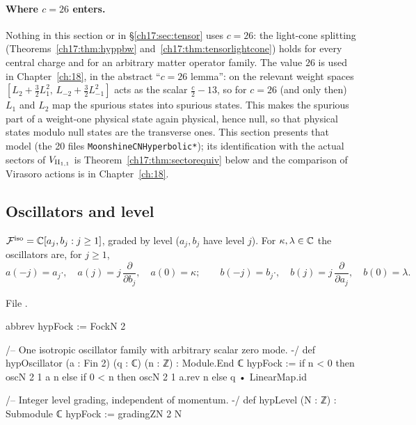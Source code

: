 \paragraph{Where $c=26$ enters.}  Nothing in this section or in \S\ref{ch17:sec:tensor} uses $c=26$: the light-cone
splitting (Theorems~\ref{ch17:thm:hyppbw} and~\ref{ch17:thm:tensorlightcone}) holds for every central charge and for an
arbitrary matter operator family.  The value $26$ is used in Chapter~\ref{ch:18}, in the abstract ``$c=26$ lemma'': on the relevant
weight spaces $[L_2+\tfrac32L_1^2,\,L_{-2}+\tfrac32L_{-1}^2]$ acts as the scalar $\tfrac c2-13$, so for $c=26$ (and only then)
$L_1$ and $L_2$ map the spurious states into spurious states.  This makes the spurious part of a weight-one physical
state again physical, hence null, so that physical states modulo null states are the transverse ones.  This section presents that model (the 20 files
\texttt{MoonshineCNHyperbolic*}); its identification with the actual sectors of ${V_{\mathrm{II}_{1,1}}}$ is
Theorem~\ref{ch17:thm:sectorequiv} below and the comparison of Virasoro actions is in Chapter~\ref{ch:18}.

\subsection{Oscillators and level}

\begin{definition}\label{ch17:def:hypfock}
$\mathcal{F}^{\mathrm{iso}}={\mathbb{C}}[a_j,b_j:j\ge1]$, graded by level ($a_j,b_j$ have level $j$).  For $\kappa,\lambda\in{\mathbb{C}}$ the
oscillators are, for $j\ge1$,
\begin{equation*}
  a(-j)=a_j\cdot,\quad a(j)=j\,\frac{\partial}{\partial b_j},\quad a(0)=\kappa;\qquad
  b(-j)=b_j\cdot,\quad b(j)=j\,\frac{\partial}{\partial a_j},\quad b(0)=\lambda .
\end{equation*}
\end{definition}

\noindent File .
\begin{leancode}
abbrev hypFock := FockN 2

/-- One isotropic oscillator family with arbitrary scalar zero mode. -/
def hypOscillator (a : Fin 2) (q : ℂ) (n : ℤ) : Module.End ℂ hypFock :=
  if n < 0 then oscN 2 1 a n
  else if 0 < n then oscN 2 1 a.rev n
  else q • LinearMap.id

/-- Integer level grading, independent of momentum. -/
def hypLevel (N : ℤ) : Submodule ℂ hypFock := gradingZN 2 N
\end{leancode}

